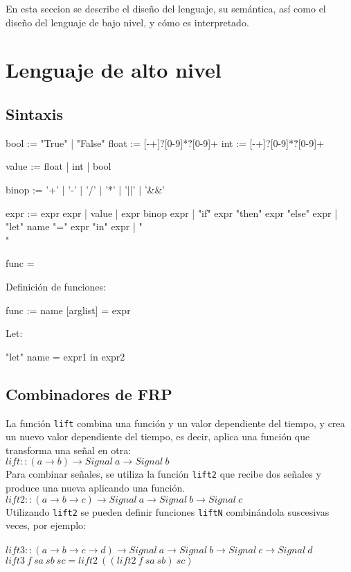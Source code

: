 En esta seccion se describe el diseño del lenguaje, su semántica,
así como el diseño del lenguaje de bajo nivel, y cómo es interpretado.

\section{Lenguaje de alto nivel}

\subsection{Sintaxis}

bool := "True" | "False"
float := [-+]?[0-9]*\.?[0-9]+
int := [-+]?[0-9]*\.?[0-9]+

value := float | int | bool

binop := '+' | '-' | '/' | '*' | '||' | '&&'

expr := expr expr 
      | value
      | expr binop expr
      | "if" expr "then" expr "else" expr
      | "let" name "=" expr "in" expr
      | "\\"

func = 


Definición de funciones:

func := name [arglist] = expr

Let:

"let" name = expr1 in expr2

\subsection{Combinadores de FRP}

La función \texttt{lift} combina una función y un valor
dependiente del tiempo, y crea un nuevo valor dependiente
del tiempo, es decir, aplica una función que transforma
una señal en otra:\\


$lift :: (a \rightarrow b) \rightarrow Signal\ a \rightarrow Signal\ b$\\


Para combinar señales, se utiliza la función \texttt{lift2}
que recibe dos señales y produce una nueva aplicando una
función.\\

$lift2 :: (a \rightarrow b \rightarrow c) \rightarrow Signal\ a \rightarrow Signal\ b \rightarrow Signal\ c$\\

Utilizando \texttt{lift2} se pueden definir funciones \texttt{liftN}
combinándola suscesivas veces, por ejemplo:\\
\\
$lift3 :: (a \rightarrow b \rightarrow c \rightarrow d) \rightarrow Signal\ a \rightarrow Signal\ b \rightarrow Signal\ c \rightarrow Signal\ d$\\
$lift3\ f\ sa\ sb\ sc = lift2\ ((lift2\ f\ sa\ sb)\ sc)$\\

